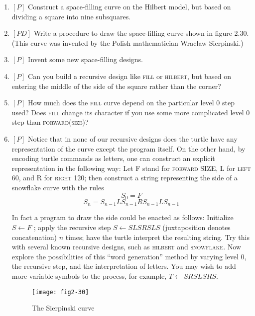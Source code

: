 \documentclass{book}
\begin{document}
\begin{enumerate}
\item $[P]$ Construct a space-filling curve on the Hilbert model, but based
on dividing a square into nine subsquares.
\item $[PD]$ Write a procedure to draw the space-filling curve shown in figure
2.30. (This curve was invented by the Polish mathematician Wraclaw
Sierpinski.)  
\item $[P]$ Invent some new space-filling designs.
\item $[P]$ Can you build a recursive design like \textsc{fill} or \textsc{hilbert}, but based
on entering the middle of the side of the square rather than the corner?
\item $[P]$ How much does the \textsc{fill} curve depend on the particular level
0 step used? Does \textsc{fill} change its character if you use some more
complicated level 0 step than \textsc{forward(size)}?
\item $[P]$ Notice that in none of our recursive designs does the turtle
have any representation of the curve except the program itself. On
the other hand, by encoding turtle commands as letters, one can construct an explicit representation in the following way: Let F stand for
\textsc{forward} SIZE, L for \textsc{left} 60, and R for \textsc{right} 120; then construct a
string representing the side of a snowflake curve with the rules
$$S_0 = F$$
$$S_n = S_{n-1}LS_{n-1}RS_{n-1}LS_{n-1}$$

In fact a program to draw the side could be enacted as follows: Initialize
$S \leftarrow F$ ; apply the recursive step $S \leftarrow SLSRSLS$ (juxtaposition denotes
concatenation) $n$ times; have the turtle interpret the resulting string.
Try this with several known recursive designs, such as \textsc{hilbert} and
\textsc{snowflake}. Now explore the possibilities of this ``word generation''
method by varying level 0, the recursive step, and the interpretation of
letters. You may wish to add more variable symbols to the process,
for example, $T \leftarrow SRSLSRS$.

\begin{figure}
\begin{center}
\texttt{[image: fig2-30]}
\caption{The Sierpinski curve}
\end{center}
\end{figure}


\end{enumerate}
\end{document}

